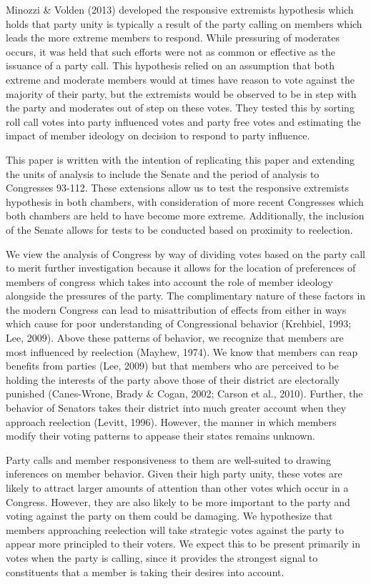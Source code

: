\documentclass[12pt]{article}
\begin{document}
Minozzi \& Volden (2013) developed the responsive extremists hypothesis which holds that party unity is typically a result of the party calling on members which leads the more extreme members to respond. While pressuring of moderates occurs, it was held that such efforts were not as common or effective as the issuance of a party call. This hypothesis relied on an assumption that both extreme and moderate members would at times have reason to vote against the majority of their party, but the extremists would be observed to be in step with the party and moderates out of step on these votes. They tested this by sorting roll call votes into party influenced votes and party free votes and estimating the impact of member ideology on decision to respond to party influence.

This paper is written with the intention of replicating this paper and extending the units of analysis to include the Senate and the period of analysis to Congresses 93-112. These extensions allow us to test the responsive extremists hypothesis in both chambers, with consideration of more recent Congresses which both chambers are held to have become more extreme. Additionally, the inclusion of the Senate allows for tests to be conducted based on proximity to reelection.

We view the analysis of Congress by way of dividing votes based on the party call to merit further investigation because it allows for the location of preferences of members of congress which takes into account the role of member ideology alongside the pressures of the party. The complimentary nature of these factors in the modern Congress can lead to misattribution of effects from either in ways which cause for poor understanding of Congressional behavior (Krehbiel, 1993; Lee, 2009). Above these patterns of behavior, we recognize that members are most influenced by reelection (Mayhew, 1974). We know that members can reap benefits from parties (Lee, 2009) but that members who are perceived to be holding the interests of the party above those of their district are electorally punished (Canes-Wrone, Brady \& Cogan, 2002; Carson et al., 2010). Further, the behavior of Senators takes their district into much greater account when they approach reelection (Levitt, 1996). However, the manner in which members modify their voting patterns to appease their states remains unknown.

Party calls and member responsiveness to them are well-suited to drawing inferences on member behavior. Given their high party unity, these votes are likely to attract larger amounts of attention than other votes which occur in a Congress. However, they are also likely to be more important to the party and voting against the party on them could be damaging. We hypothesize that members approaching reelection will take strategic votes against the party to appear more principled to their voters. We expect this to be present primarily in votes when the party is calling, since it provides the strongest signal to constituents that a member is taking their desires into account. 
\end{document}
